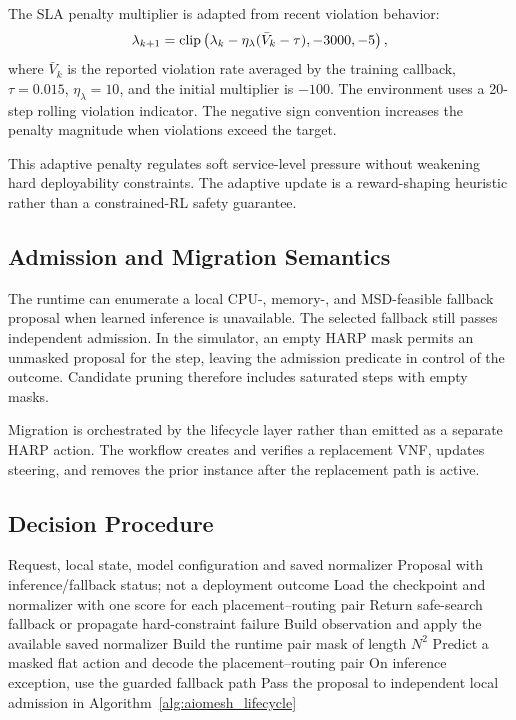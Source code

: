 \documentclass[final,5p]{elsarticle}
\newcommand{\rev}[1]{\textcolor{revisiongreen}{#1}}
\let\newrev\rev
\begin{document}
The SLA penalty multiplier is adapted from recent violation behavior:
\begin{equation}
\rev{\lambda_{k+1}=\mathrm{clip}\left(\lambda_k-\eta_\lambda(\bar{V}_k-\tau),-3000,-5\right),}
\label{eq:lambda_update}
\end{equation}
\rev{where \(\bar V_k\) is the reported violation rate averaged by the training callback, \(\tau=0.015\), \(\eta_\lambda=10\), and the initial multiplier is \(-100\). The environment uses a 20-step rolling violation indicator. The negative sign convention increases the penalty magnitude when violations exceed the target.}

This adaptive penalty regulates soft service-level pressure without weakening hard deployability constraints. \rev{The adaptive update is a reward-shaping heuristic rather than a constrained-RL safety guarantee. }

\subsection{Admission and Migration Semantics}
\label{subsec:harp_admission}
\newrev{The runtime can enumerate a local CPU-, memory-, and MSD-feasible fallback proposal when learned inference is unavailable. The selected fallback still passes independent admission. In the simulator, an empty HARP mask permits an unmasked proposal for the step, leaving the admission predicate in control of the outcome. Candidate pruning therefore includes saturated steps with empty masks.}

Migration is orchestrated by the lifecycle layer rather than emitted as a separate HARP action. The workflow creates and verifies a replacement VNF, updates steering, and removes the prior instance after the replacement path is active.

\subsection{Decision Procedure}
\label{subsec:harp_decision_procedure}
\begin{algorithm}[t]
\caption{Runtime inference path for a flat N²-action policy checkpoint}
\label{alg:harp_decision}
\small
\begin{algorithmic}[1]
\Require Request, local state, model configuration and saved normalizer
\Ensure Proposal with inference/fallback status; not a deployment outcome
\State \newrev{Load the checkpoint and normalizer with one score for each placement--routing pair}
    \State Return safe-search fallback or propagate hard-constraint failure
\EndIf
\State Build observation and apply the available saved normalizer
\State Build the runtime pair mask of length \(N^2\)
\State Predict a masked flat action and decode the placement--routing pair
\State On inference exception, use the guarded fallback path
\State Pass the proposal to independent local admission in Algorithm~\ref{alg:aiomesh_lifecycle}
\end{algorithmic}
\end{algorithm}
\end{document}
